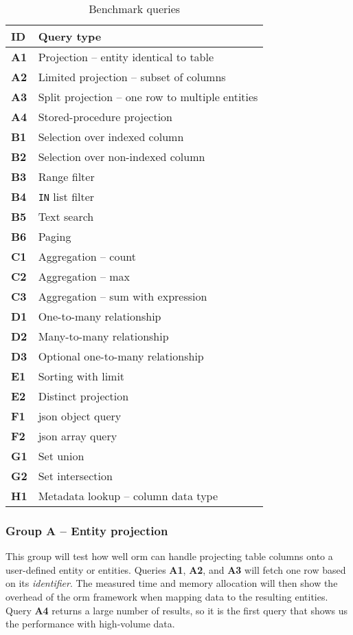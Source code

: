 \begin{table}[H]
\centering
\caption{Benchmark queries}\label{tab:queries-sum}
\begin{tabular}{ll}
\toprule
\textbf{ID} & \textbf{Query type} \\ 
\midrule
\textbf{A1} & Projection -- entity identical to table \\ 
\textbf{A2} & Limited projection -- subset of columns \\ 
\textbf{A3} & Split projection -- one row to multiple entities \\ 
\textbf{A4} & Stored-procedure projection \\ 
\textbf{B1} & Selection over indexed column \\ 
\textbf{B2} & Selection over non-indexed column \\ 
\textbf{B3} & Range filter \\ 
\textbf{B4} & \texttt{IN} list filter \\ 
\textbf{B5} & Text search \\ 
\textbf{B6} & Paging \\ 
\textbf{C1} & Aggregation -- count \\ 
\textbf{C2} & Aggregation -- max \\ 
\textbf{C3} & Aggregation -- sum with expression \\ 
\textbf{D1} & One-to-many relationship\\ 
\textbf{D2} & Many-to-many relationship \\ 
\textbf{D3} & Optional one-to-many relationship \\ 
\textbf{E1} & Sorting with limit \\ 
\textbf{E2} & Distinct projection \\ 
\textbf{F1} & \acrshort{json} object query \\ 
\textbf{F2} & \acrshort{json} array query \\ 
\textbf{G1} & Set union\\ 
\textbf{G2} & Set intersection \\ 
\textbf{H1} & Metadata lookup -- column data type \\ 
\bottomrule
\end{tabular}
\end{table}

\subsubsection{Group A -- Entity projection}
This group will test how well \acrshort{orm} can handle projecting table columns onto a user-defined entity or entities. Queries \textbf{A1}, \textbf{A2}, and \textbf{A3} will fetch one row based on its \textit{identifier}. The measured time and memory allocation will then show the overhead of the \acrshort{orm} framework when mapping data to the resulting entities. Query \textbf{A4} returns a large number of results, so it is the first query that shows us the performance with high-volume data.

